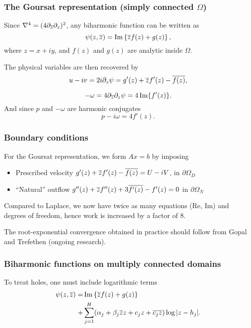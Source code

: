 \begin{frame}
\frametitle{The Goursat representation (simply connected $\Omega$)}
Since $\nabla^4=(4\partial_{\overline{z}}\partial_z)^2$, any biharmonic function can be written as
\begin{equation*}
\psi(z,{\overline{z}})=\Im\left\{{\overline{z}}f(z)+g(z)\right\},
\end{equation*}
where $z=x+iy$, and $f(z)$ and $g(z)$ are analytic inside $\Omega$.

\bigskip
The physical variables are then recovered by
\begin{equation*}
u-iv = 2i\partial_z\psi = g'(z) + {\overline{z}} f'(z) - {\overline{f(z)}},
\end{equation*}

\begin{equation*}
-\omega = 4\partial_{\overline{z}} \partial_z\psi = 4 \Im{f'(z)}.
\end{equation*}
And since $p$ and $-\omega$ are harmonic conjugates 
\begin{equation*}
p-i\omega = 4 f'(z).
\end{equation*}
\end{frame}

\begin{frame}
\frametitle{Boundary conditions}

For the Goursat representation, we form $Ax=b$ by imposing
\bigskip
\begin{itemize}
\itemsep=1em
\item Prescribed velocity $g'(z)+{\overline{z}}f'(z)-{\overline{f(z)}}=U-iV$, in $\partial \Omega_D$
\item ``Natural'' outflow $g''(z)+{\overline{z}}f''(z)+3{\overline{f'(z)}}-f'(z)=0$ in $\partial \Omega_N$
\end{itemize}
\bigskip
Compared to Laplace, we now have twice as many equations (Re, Im) and degrees of freedom, hence work is increased by a factor of 8.

\bigskip
The root-exponential convergence obtained in practice should follow from Gopal and Trefethen (ongoing research).
\end{frame}

\begin{frame}
\frametitle{Biharmonic functions on multiply connected domains}
To treat holes, one must include logarithmic terms
\begin{equation*}
\begin{split}
\psi(z,{\overline{z}}) =& \Im\left\{{\overline{z}}f(z)+g(z)\right\} \\
+ &\sum_{j=1}^H (\alpha_j  + \beta_j{\overline{z}}z + c_j z + {\overline{c_j z}} ) \log\abs{z-h_j}.
\end{split}
\end{equation*}
\end{frame}
